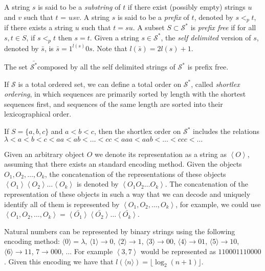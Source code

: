 A string $s$ is said to be a \emph{substring} of $t$ if there exist (possibly empty) strings $u$ and $v$ such that $t$ = $usv$. A string $s$ is said to be a \emph{prefix} of $t$, denoted by $s <_p t$, if there exists a string $u$ such that $t = su$. A subset $S \subset \mathcal{S}^{\ast}$ is \emph{prefix free} if for all $s, t \in S$, if $s <_p t$ then $s = t$. Given a string $s \in \mathcal{S}^{\ast}$, the \emph{self delimited} version of $s$, denoted by $\bar{s}$, is $\bar{s} = 1^{l(s)}0s$. Note that $l(\bar{s}) = 2l(s)+1$.

\begin{example}
The set $\bar{\mathcal{S}^{\ast}}$composed by all the self delimited strings of $\mathcal{S}^{\ast}$ is prefix free.
\end{example}

If $\mathcal{S}$ is a total ordered set, we can define a total order on $\mathcal{S}^{\ast}$, called \emph{shortlex ordering}, in which sequences are primarily sorted by length with the shortest sequences first, and sequences of the same length are sorted into their lexicographical order.

\begin{example}
If $S = \{a, b, c\}$ and $a < b < c$, then the shortlex order on $\mathcal{S}^{\ast}$ includes the relations $\lambda < a < b < c < aa < ab < \ldots < cc < aaa < aab < \ldots < ccc < \ldots$
\end{example}

Given an arbitrary object $O$ we denote its representation as a string as $\left\langle O\right\rangle$, assuming that there exists an standard encoding method. Given the objects $O_{1},O_{2},\ldots,O_{k}$, the concatenation of the representations of these objects $\left\langle O_1 \right\rangle \left\langle O_2 \right\rangle \ldots \left\langle O_k \right\rangle$ is denoted by $\left\langle O_1 O_2 \ldots O_k \right\rangle$. The concatenation of the representation of these objects in such a way that we can decode and uniquely identify all of them is represented by $\left\langle O_1, O_2,\ldots,O_k \right\rangle$, for example, we could use $\left\langle O_1, O_2,\ldots,O_k \right\rangle = \bar{\left\langle O_1 \right\rangle} \bar{\left\langle O_2 \right\rangle} \ldots \bar{\left\langle O_k \right\rangle}$.

\begin{example}
Natural numbers can be represented by binary strings using the following encoding method: $\langle 0 \rangle = \lambda$, $\langle 1 \rangle \rightarrow 0$, $\langle 2 \rangle \rightarrow 1$, $\langle 3 \rangle \rightarrow 00$, $\langle 4 \rangle \rightarrow 01$, $\langle 5 \rangle \rightarrow 10$, $\langle 6 \rangle \rightarrow 11$, $7 \rightarrow 000$, ... For example $\left\langle 3, 7 \right\rangle$  would be represented as $110001110000$. Given this encoding we have that $l \left( \langle n \rangle \right) = \lfloor \log_2 (n + 1) \rfloor$.
\end{example}


